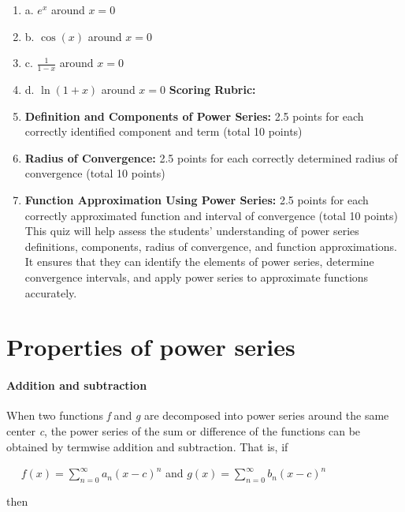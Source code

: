 \begin{enumerate}
    \item a. \( e^x \) around \( x = 0 \)
    \item b. \( \cos(x) \) around \( x = 0 \)
    \item c. \( \frac{1}{1-x} \) around \( x = 0 \)
    \item d. \( \ln(1+x) \) around \( x = 0 \) \textbf{Scoring Rubric:}
    \item \textbf{Definition and Components of Power Series:} 2.5 points for each correctly identified component and term (total 10 points)
    \item \textbf{Radius of Convergence:} 2.5 points for each correctly determined radius of convergence (total 10 points)
    \item \textbf{Function Approximation Using Power Series:} 2.5 points for each correctly approximated function and interval of convergence (total 10 points) This quiz will help assess the students' understanding of power series definitions, components, radius of convergence, and function approximations. It ensures that they can identify the elements of power series, determine convergence intervals, and apply power series to approximate functions accurately.
\end{enumerate}

\section{Properties of power series}
\label{sec:properties-of-power-series}

\paragraph{Addition and subtraction}



When two functions \textit{f} and \textit{g} are decomposed into power series around the same center \textit{c}, the power series of the sum or difference of the functions can be obtained by termwise addition and subtraction. That is, if





$\quad$ $f(x) = \sum _{n=0}^\infty a _n (x - c)^n$ and $g(x) = \sum _{n=0}^\infty b _n (x - c)^n$



then





